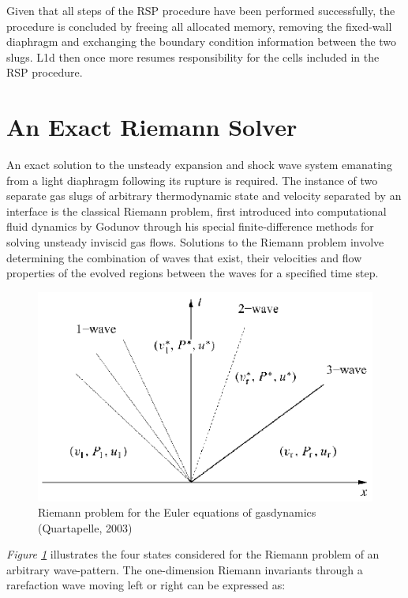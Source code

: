 \documentclass[a4paper,10pt]{article}
\begin{document}
\par \medskip

Given that all steps of the RSP procedure have been performed successfully, the procedure is concluded by freeing all allocated memory, removing the fixed-wall diaphragm and exchanging the boundary condition information between the two slugs.  L1d then once more resumes responsibility for the cells included in the RSP procedure.

\section{An Exact Riemann Solver}

An exact solution to the unsteady expansion and shock wave system
emanating from a light diaphragm following its
rupture is required.  The instance of two separate gas slugs of
arbitrary thermodynamic state and velocity separated by an
interface is the classical Riemann problem, first introduced into
computational fluid dynamics by Godunov through his special
finite-difference methods for solving unsteady inviscid gas flows\cite{gottlieb}.  Solutions to the Riemann problem involve
determining the combination of waves that exist, their velocities
and flow properties of the evolved regions between the waves for a
specified time step.

\par \medskip

\begin{figure}[hbt]
\centering
\includegraphics[scale=1.9]{figs/quart_riem.eps}
\caption{Riemann problem for the Euler equations of gasdynamics (Quartapelle, 2003)}
\label{fig:quart_riem}
\end{figure}

\emph{Figure \ref{fig:quart_riem}} illustrates the four states considered for the Riemann problem of an arbitrary wave-pattern.  The one-dimension Riemann invariants through a rarefaction wave
moving left or right can be expressed as:
\end{document}
